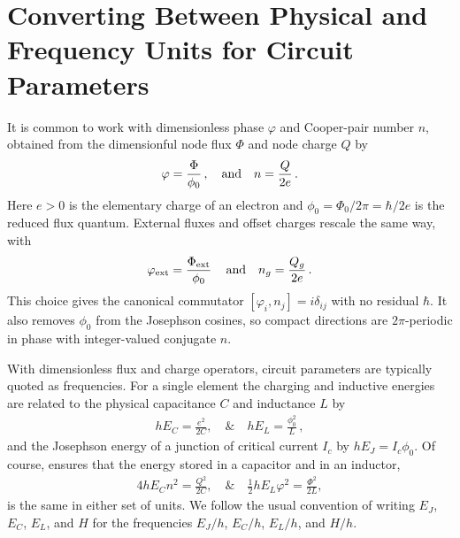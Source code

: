 \section{Converting Between Physical and Frequency Units for Circuit Parameters}\label{apx:params}
It is common to work with dimensionless phase $\varphi$ and Cooper-pair number $n$, obtained from the dimensionful node flux $\Phi$ and node charge $Q$ by
\begin{align}
    \varphi = \frac{\Phi}{\phi_0}\,, \quad {\rm and} \quad
    n = \frac{Q}{2e}\, .
    \label{eq:dimless_defs}
\end{align}
Here $e>0$ is the elementary charge of an electron and $\phi_0 = \Phi_0/2\pi = \hbar/2e$ is the reduced flux quantum.
External fluxes and offset charges rescale the same way, with 
\begin{align}
\varphi_{\rm ext} = \frac{\Phi_{\rm ext}}{\phi_0}\, \quad {\rm and} \quad n_g = \frac{Q_g}{2e} \, .
\end{align}
This choice gives the canonical commutator $[\varphi_i, n_j] = i\delta_{ij}$ with no residual $\hbar$.
It also removes $\phi_0$ from the Josephson cosines, so compact directions are $2\pi$-periodic in phase with integer-valued conjugate $n$.

With dimensionless flux and charge operators, circuit parameters are typically quoted as frequencies.
For a single element the charging and inductive energies are related to the physical capacitance $C$ and inductance $L$ by
\begin{align}
 h E_C = \frac{e^2}{2C}, \quad \& \quad
 h E_L = \frac{\phi_0^2}{L}\,,
 \label{eq:EC_EL_scalar}
\end{align}
and the Josephson energy of a junction of critical current $I_c$ by $hE_J = I_c\phi_0$.
Of course,  ensures that the energy stored in a capacitor and in an inductor,
\begin{align}
 4 h E_C n^2 = \frac{Q^2}{2C}, \quad \& \quad
 \frac{1}{2} h E_L \varphi^2 = \frac{\Phi^2}{2 L},
\end{align}
is the same in either set of units.
We follow the usual convention of writing $E_J$, $E_C$, $E_L$, and $H$ for the frequencies $E_J/h$, $E_C/h$, $E_L/h$, and $H/h$.

